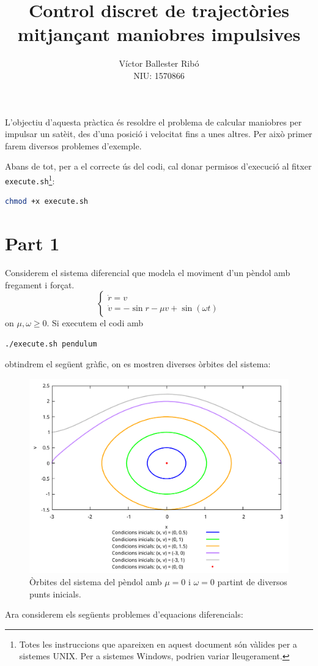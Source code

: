\documentclass[10pt,a4paper]{article}
\title{\bfseries\Large Control discret de trajectòries mitjançant maniobres impulsives}
\author{Víctor Ballester Ribó\\NIU: 1570866}
\date{\parbox{\linewidth}{\centering
  Càlcul numèric\endgraf
  Grau en Matemàtiques\endgraf
  Universitat Autònoma de Barcelona\endgraf
  Juny de 2023}}
\theoremstyle{definition}
\theoremstyle{remark}
\begin{document}
\maketitle
L'objectiu d'aquesta pràctica és resoldre el problema de calcular maniobres per impulsar un satè\lgem it, des d'una posició i velocitat fins a unes altres. Per això primer farem diversos problemes d'exemple.

Abans de tot, per a el correcte ús del codi, cal donar permisos d'execució al fitxer \texttt{execute.sh}\footnote{Totes les instruccions que apareixen en aquest document són vàlides per a sistemes UNIX. Per a sistemes Windows, podrien variar lleugerament.}:
\begin{lstlisting}[language=Bash]
chmod +x execute.sh
\end{lstlisting}
\section*{Part 1}
Considerem el sistema diferencial que modela el moviment d'un pèndol amb fregament i forçat.
$$
  \begin{cases}
    \dot{r} = v \\
    \dot{v} = -\sin r - \mu v + \sin(\omega t)
  \end{cases}
$$
on $\mu,\omega\geq 0$. Si executem el codi amb
\begin{lstlisting}[language=Bash]
./execute.sh pendulum
\end{lstlisting}
obtindrem el següent gràfic, on es mostren diverses òrbites del sistema:
\begin{figure}[ht]
  \centering
  \includegraphics[width=0.7\linewidth]{Images/pendulum.pdf}
  \caption{Òrbites del sistema del pèndol amb $\mu=0$ i $\omega=0$ partint de diversos punts inicials.}
\end{figure}
Ara considerem els següents problemes d'equacions diferencials:
\end{document}
